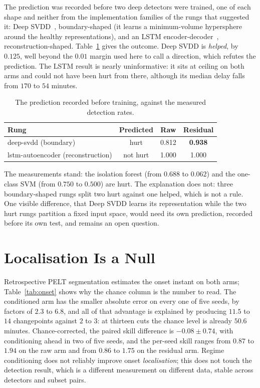 \documentclass[journal]{IEEEtran}
\begin{document}
The prediction was recorded before two deep detectors were trained, one of each shape and neither from
the implementation families of the rungs that suggested it: Deep SVDD~\cite{ruff2018}, boundary-shaped
(it learns a minimum-volume hypersphere around the healthy representations), and an LSTM
encoder-decoder~\cite{malhotra2016}, reconstruction-shaped. Table~\ref{tab:prereg} gives the outcome.
Deep SVDD is \emph{helped}, by $0.125$, well beyond the $0.01$ margin used here to call a direction, which
refutes the prediction. The LSTM result is nearly uninformative: it sits at ceiling on both arms and could
not have been hurt from there, although its median delay falls from $170$ to $54$ minutes.

\begin{table}[!t]
\caption{The prediction recorded before training, against the measured detection rates.}
\label{tab:prereg}
\centering
\small
\begin{tabular}{lccc}
\toprule
Rung & Predicted & Raw & Residual \\
\midrule
deep-svdd (boundary) & hurt & 0.812 & \textbf{0.938} \\
lstm-autoencoder (reconstruction) & not hurt & 1.000 & 1.000 \\
\bottomrule
\end{tabular}
\end{table}

The measurements stand: the isolation forest (from $0.688$ to $0.062$) and the one-class SVM (from $0.750$ to $0.500$)
are hurt. The explanation does not: three boundary-shaped rungs split two hurt against one helped, which is
not a rule. One visible difference, that Deep SVDD learns its representation while the two hurt rungs
partition a fixed input space, would need its own prediction, recorded before its own test, and remains an
open question.

\section{Localisation Is a Null}

Retrospective PELT segmentation estimates the onset instant on both arms; Table~\ref{tab:onset} shows
why the chance column is the number to read. The conditioned arm has the smaller absolute error on every
one of five seeds, by factors of $2.3$ to $6.8$, and all of that advantage is explained by producing $11.5$
to $14$ changepoints against $2$ to $3$: at thirteen cuts the chance level is already $50.6$ minutes.
Chance-corrected, the paired skill difference is
$-0.08 \pm 0.74$, with conditioning ahead in two of five seeds, and the per-seed skill ranges from $0.87$ to
$1.94$ on the raw arm and from $0.86$ to $1.75$ on the residual arm. Regime conditioning does not reliably
improve onset \emph{localisation}; this does not touch the detection result, which is a different
measurement on different data, stable across detectors and subset pairs.
\end{document}
